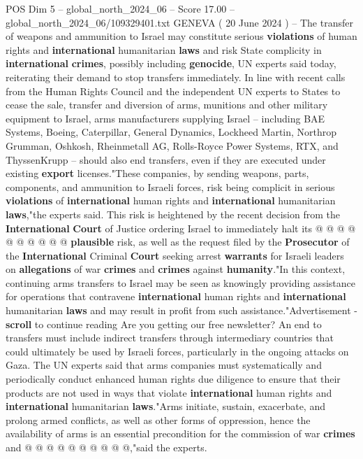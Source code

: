 \begin{textsample}{POS Dim 5 – global\_north\_2024\_06 – Score 17.00 – global\_north\_2024\_06/109329401.txt}  \label{ex:f5_pos_372}
GENEVA ( 20 June 2024 ) -- The transfer of weapons and ammunition to Israel may constitute serious \textbf{violations} of human rights and \textbf{international} humanitarian \textbf{laws} and risk State complicity in \textbf{international} \textbf{crimes}, possibly including \textbf{genocide}, UN experts said today, reiterating their demand to stop transfers immediately.
In line with recent calls from the Human Rights Council and the independent UN experts to States to cease the sale, transfer and diversion of arms, munitions and other military equipment to Israel, arms manufacturers supplying Israel -- including BAE Systems, Boeing, Caterpillar, General Dynamics, Lockheed Martin, Northrop Grumman, Oshkosh, Rheinmetall AG, Rolls-Royce Power Systems, RTX, and ThyssenKrupp -- should also end transfers, even if they are executed under existing \textbf{export} licenses."These companies, by sending weapons, parts, components, and ammunition to Israeli forces, risk being complicit in serious \textbf{violations} of \textbf{international} human rights and \textbf{international} humanitarian \textbf{laws},"the experts said.
This risk is heightened by the recent decision from the \textbf{International} \textbf{Court} of Justice ordering Israel to immediately halt its @ @ @ @ @ @ @ @ @ @ \textbf{plausible} risk, as well as the request filed by the \textbf{Prosecutor} of the \textbf{International} Criminal \textbf{Court} seeking arrest \textbf{warrants} for Israeli leaders on \textbf{allegations} of war \textbf{crimes} and \textbf{crimes} against \textbf{humanity}."In this context, continuing arms transfers to Israel may be seen as knowingly providing assistance for operations that contravene \textbf{international} human rights and \textbf{international} humanitarian \textbf{laws} and may result in profit from such assistance."Advertisement - \textbf{scroll} to continue reading Are you getting our free newsletter?
An end to transfers must include indirect transfers through intermediary countries that could ultimately be used by Israeli forces, particularly in the ongoing attacks on Gaza.
The UN experts said that arms companies must systematically and periodically conduct enhanced human rights due diligence to ensure that their products are not used in ways that violate \textbf{international} human rights and \textbf{international} humanitarian \textbf{laws}."Arms initiate, sustain, exacerbate, and prolong armed conflicts, as well as other forms of oppression, hence the availability of arms is an essential precondition for the commission of war \textbf{crimes} and @ @ @ @ @ @ @ @ @ @,"said the experts.

\end{textsample}
